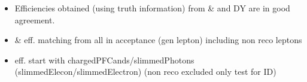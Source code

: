 \documentclass{beamer}
\begin{document}
\begin{frame}
\begin{columns}
\begin{column}{0.33\textwidth}
   \end{column}
  \end{columns}
\begin{itemize}
 \item Efficiencies obtained (using truth information) from \ttbar \& \wpj and DY are in good agreement.
 \item \ttbar \& \wpj eff. matching from all in acceptance (gen lepton) including non reco leptons
 \item \Zll eff. start with chargedPFCands/slimmedPhotons (slimmedElecon/slimmedElectron) (non reco excluded only test for ID)
\end{itemize}

\end{frame}
\end{document}
